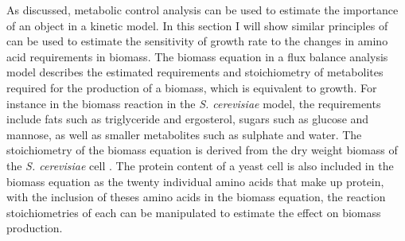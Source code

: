 As discussed, metabolic control analysis can be used to estimate the importance of an object in a kinetic model. In this section I will show similar principles of can be used to estimate the sensitivity of growth rate to the changes in amino acid requirements in biomass. The biomass equation in a flux balance analysis model describes the estimated requirements and stoichiometry of metabolites required for the production of a biomass, which is equivalent to growth. For instance in the biomass reaction in the \emph{S. cerevisiae} model, the requirements include fats such as triglyceride and ergosterol, sugars such as glucose and mannose, as well as smaller metabolites such as sulphate and water. The stoichiometry of the biomass equation is derived from the dry weight biomass of the \emph{S. cerevisiae} cell \cite{duarte2004}. The protein content of a yeast cell is also included in the biomass equation as the twenty individual amino acids that make up protein, with the inclusion of theses amino acids in the biomass equation, the reaction stoichiometries of each can be manipulated to estimate the effect on biomass production.

\begin{figure}
  \hfill
  \hfill
  \hfill
  \label{figure:curve_estimation}
\end{figure}

